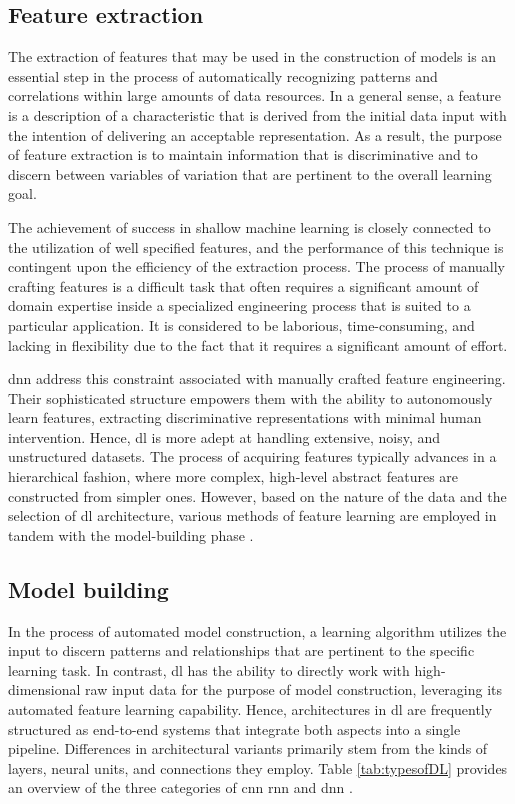 \subsection{Feature extraction}

The extraction of features that may be used in the construction of models is an essential step in the process of automatically recognizing patterns and correlations within large amounts of data resources. In a general sense, a feature is a description of a characteristic that is derived from the initial data input with the intention of delivering an acceptable representation. As a result, the purpose of feature extraction is to maintain information that is discriminative and to discern between variables of variation that are pertinent to the overall learning goal.

The achievement of success in shallow machine learning is closely connected to the utilization of well specified features, and the performance of this technique is contingent upon the efficiency of the extraction process. The process of manually crafting features is a difficult task that often requires a significant amount of domain expertise inside a specialized engineering process that is suited to a particular application. It is considered to be laborious, time-consuming, and lacking in flexibility due to the fact that it requires a significant amount of effort.

\acrfull{dnn} address this constraint associated with manually crafted feature engineering. Their sophisticated structure empowers them with the ability to autonomously learn features, extracting discriminative representations with minimal human intervention. Hence, \acrshort{dl} is more adept at handling extensive, noisy, and unstructured datasets. The process of acquiring features typically advances in a hierarchical fashion, where more complex, high-level abstract features are constructed from simpler ones. 
However, based on the nature of the data and the selection of \acrshort{dl} architecture, various methods of feature learning are employed in tandem with the model-building phase \cite{janiesch2021machine}.

\subsection{Model building} 
In the process of automated model construction, a learning algorithm utilizes the input to discern patterns and relationships that are pertinent to the specific learning task. In contrast, \acrshort{dl} has the ability to directly work with high-dimensional raw input data for the purpose of model construction, leveraging its automated feature learning capability. Hence, architectures in \acrshort{dl} are frequently structured as end-to-end systems that integrate both aspects into a single pipeline.  Differences in architectural variants primarily stem from the kinds of layers, neural units, and connections they employ. Table \ref{tab:typesofDL} provides an overview of the three categories of \acrshort{cnn} \acrfull{rnn} and \acrshort{dnn} \cite{janiesch2021machine}.

